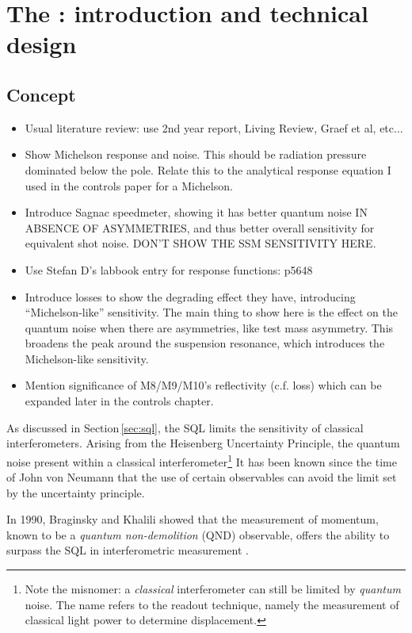 \chapter{\label{c:speedmeter-intro}The \SSMEXPT{}: introduction and technical design}

\section{Concept}
\begin{itemize}
  \item Usual literature review: use 2nd year report, Living Review, Graef et al, etc...
  \item Show Michelson response and noise. This should be radiation pressure dominated below the pole. Relate this to the analytical response equation I used in the controls paper for a Michelson.
  \item Introduce Sagnac speedmeter, showing it has better quantum noise IN ABSENCE OF ASYMMETRIES, and thus better overall sensitivity for equivalent shot noise. DON'T SHOW THE SSM SENSITIVITY HERE.
  \item Use Stefan D's labbook entry for response functions: p5648
  \item Introduce losses to show the degrading effect they have, introducing ``Michelson-like'' sensitivity. The main thing to show here is the effect on the quantum noise when there are asymmetries, like test mass asymmetry. This broadens the peak around the suspension resonance, which introduces the Michelson-like sensitivity.
  \item Mention significance of M8/M9/M10's reflectivity (c.f. loss) which can be expanded later in the controls chapter.
\end{itemize}

As discussed in Section\,\ref{sec:sql}, the \gls{SQL} limits the sensitivity of classical interferometers. Arising from the Heisenberg Uncertainty Principle, the quantum noise present within a classical interferometer\footnote{Note the misnomer: a \emph{classical} interferometer can still be limited by \emph{quantum} noise. The name refers to the readout technique, namely the measurement of classical light power to determine displacement.} It has been known since the time of John von Neumann  that the use of certain observables can avoid the limit set by the uncertainty principle.

In 1990, Braginsky and Khalili showed that the measurement of momentum, known to be a \emph{quantum non-demolition} (\gls{QND}) observable, offers the ability to surpass the \gls{SQL} in interferometric measurement \cite{Braginsky1990}.





